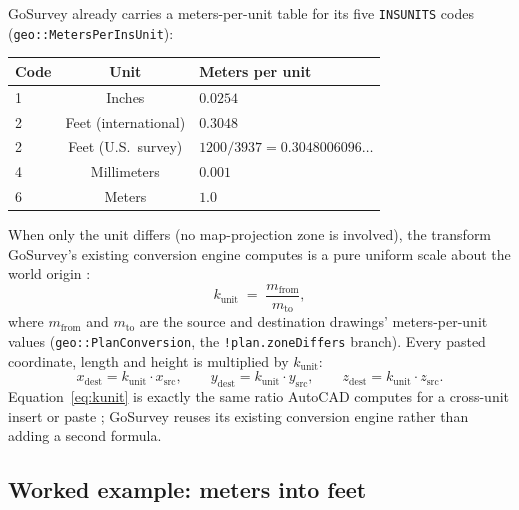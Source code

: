 \documentclass[11pt]{article}
\begin{document}
GoSurvey already carries a meters-per-unit table for its five
\texttt{INSUNITS} codes (\texttt{geo::MetersPerInsUnit}):
\begin{center}
\begin{tabular}{@{}lcl@{}}
\toprule
Code & Unit & Meters per unit \\
\midrule
1 & Inches & $0.0254$ \\
2 & Feet (international) & $0.3048$ \\
2 & Feet (U.S.\ survey) & $1200/3937 = 0.3048006096\ldots$ \\
4 & Millimeters & $0.001$ \\
6 & Meters & $1.0$ \\
\bottomrule
\end{tabular}
\end{center}
When only the unit differs (no map-projection zone is involved), the
transform GoSurvey's existing conversion engine computes is a pure uniform
scale about the world origin \citep{goSurveyRepo}:
\begin{equation}
k_{\mathrm{unit}} \;=\; \frac{m_{\mathrm{from}}}{m_{\mathrm{to}}},
\label{eq:kunit}
\end{equation}
where $m_{\mathrm{from}}$ and $m_{\mathrm{to}}$ are the source and
destination drawings' meters-per-unit values (\texttt{geo::PlanConversion},
the \texttt{!plan.zoneDiffers} branch). Every pasted coordinate, length and
height is multiplied by $k_{\mathrm{unit}}$:
\begin{equation}
x_{\mathrm{dest}} = k_{\mathrm{unit}} \cdot x_{\mathrm{src}}, \qquad
y_{\mathrm{dest}} = k_{\mathrm{unit}} \cdot y_{\mathrm{src}}, \qquad
z_{\mathrm{dest}} = k_{\mathrm{unit}} \cdot z_{\mathrm{src}}.
\label{eq:scaleapply}
\end{equation}
Equation~\ref{eq:kunit} is exactly the same ratio AutoCAD computes for a
cross-unit insert or paste \citep{autodeskInsunits}; GoSurvey reuses its
existing conversion engine rather than adding a second formula.

\subsection*{Worked example: meters into feet}
\end{document}
